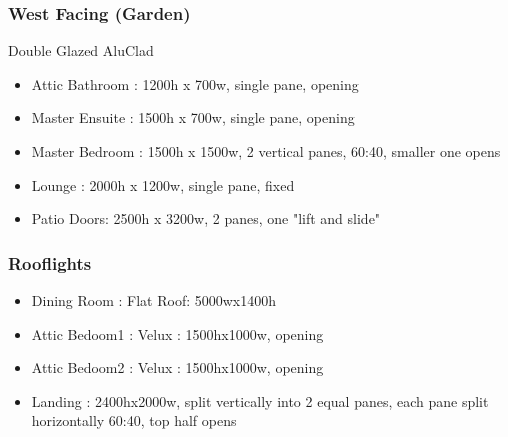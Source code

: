 \subsubsection{West Facing (Garden)}
Double Glazed AluClad
\begin{itemize}
\item Attic Bathroom : 1200h x 700w, single pane, opening
\item Master Ensuite : 1500h x 700w, single pane, opening
\item Master Bedroom : 1500h x 1500w, 2 vertical panes, 60:40, smaller one opens
\item Lounge : 2000h x 1200w, single pane, fixed
\item Patio Doors: 2500h x 3200w, 2 panes, one "lift and slide"
\end{itemize}

\subsubsection{Rooflights}
\begin{itemize}
\item Dining Room : Flat Roof: 5000wx1400h
\item Attic Bedoom1 : Velux : 1500hx1000w, opening
\item Attic Bedoom2 : Velux : 1500hx1000w, opening
\item Landing : 2400hx2000w, split vertically into 2 equal panes, each pane split horizontally 60:40, top half opens
\end{itemize}    
